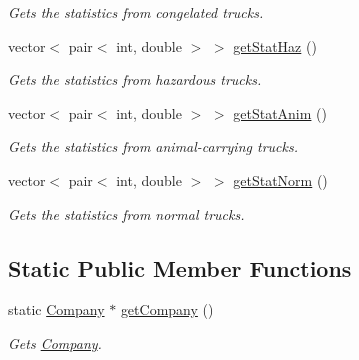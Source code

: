 \begin{DoxyCompactItemize}
\begin{DoxyCompactList}\small\item\em Gets the statistics from congelated trucks. \end{DoxyCompactList}\item 
vector$<$ pair$<$ int, double $>$ $>$ \hyperlink{class_company_aa37fd8b5214cc269f8f1a0d9b23d2c61}{get\+Stat\+Haz} ()
\begin{DoxyCompactList}\small\item\em Gets the statistics from hazardous trucks. \end{DoxyCompactList}\item 
vector$<$ pair$<$ int, double $>$ $>$ \hyperlink{class_company_af7e04162aac8a1057d2563e211e67460}{get\+Stat\+Anim} ()
\begin{DoxyCompactList}\small\item\em Gets the statistics from animal-\/carrying trucks. \end{DoxyCompactList}\item 
vector$<$ pair$<$ int, double $>$ $>$ \hyperlink{class_company_aec149faa3a58555957f83df920897253}{get\+Stat\+Norm} ()
\begin{DoxyCompactList}\small\item\em Gets the statistics from normal trucks. \end{DoxyCompactList}\end{DoxyCompactItemize}
\subsection*{Static Public Member Functions}
\begin{DoxyCompactItemize}
\item 
static \hyperlink{class_company}{Company} $\ast$ \hyperlink{class_company_a453411f6ef4bab2e878867302fdcf484}{get\+Company} ()
\begin{DoxyCompactList}\small\item\em Gets \hyperlink{class_company}{Company}. \end{DoxyCompactList}\end{DoxyCompactItemize}

